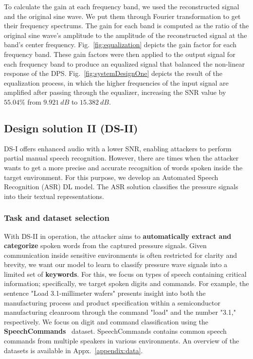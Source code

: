 To calculate the gain at each frequency band, we used the reconstructed signal and the original sine wave. We put them through Fourier transformation to get their frequency spectrums. The gain for each band is computed as the ratio of the original sine wave's amplitude to the amplitude of the reconstructed signal at the band's center frequency. Fig.~\ref{fig:equalization} depicts the gain factor for each frequency band. These gain factors were then applied to the output signal for each frequency band to produce an equalized signal that balanced the non-linear response of the DPS. 
Fig.~\ref{fig:systemDesignOne} depicts the result of the equalization process, in which the higher frequencies of the input signal are amplified after passing through the equalizer, increasing the SNR value by $55.04\%$ from $9.921~dB$ to $15.382~dB$.


\subsection{Design solution II (DS-II)}
\label{subsection:DS-2}
DS-I offers enhanced audio with a lower SNR, enabling attackers to perform partial manual speech recognition.
However, there are times when the attacker wants to get a more precise and accurate recognition of words spoken inside the target environment.
For this purpose, we develop an Automated Speech Recognition (ASR) DL model. The ASR solution classifies the pressure signals into their textual representations. 

\subsubsection{\textbf{Task and dataset selection}}
With DS-II in operation, the attacker aims to \textbf{automatically extract and categorize} spoken words from the captured pressure signals.
Given communication inside sensitive environments is often restricted for clarity and brevity, we want our model to learn to classify pressure wave signals into a limited set of \textbf{keywords}. 
For this, we focus on types of speech containing critical information; specifically, we target spoken digits and commands. 
For example, the sentence "Load 3.1-millimeter wafers" presents insight into both the manufacturing process and product specification within a semiconductor manufacturing cleanroom through the command "load" and the number "3.1," respectively. 
We focus on digit and command classification using the 
\textbf{SpeechCommands}~\cite{speechcommandsv2} dataset. SpeechCommands contains common speech commands from multiple speakers in various environments.
An overview of the datasets is available in Appx.~\ref{appendix:data}. 

